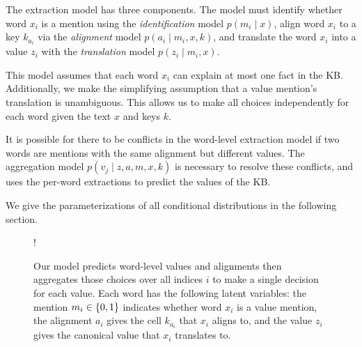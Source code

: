 \documentclass[12pt]{article}
\begin{document}
The extraction model has three components.
The model must identify whether word $x_i$
is a mention using the \textit{identification} model $p(m_i \mid x)$,
align word $x_i$ to a key $k_{a_i}$ via the \textit{alignment} model $p(a_i \mid m_i,x, k)$,
and translate the word $x_i$ into a value $z_i$ with the
\textit{translation} model $p(z_i \mid m_i,x)$.

This model assumes that each word $x_i$ can explain at most one fact in the KB.
Additionally, we make the simplifying assumption
that a value mention's translation is unambiguous.
This allows us to make all choices independently
for each word given the text $x$ and keys $k$.

It is possible for there to be conflicts in the word-level extraction model if 
two words are mentions with the same alignment but different values.
The aggregation model $p(v_j \mid z,a,m,x,k)$ is necessary to resolve these conflicts,
and uses the per-word extractions to predict the values of the KB.

We give the parameterizations of all conditional distributions in the following section.

\begin{figure}[h]
\begin{center}
\resizebox {.35\columnwidth} {!} {
} %
\end{center}
\caption{Our model predicts word-level values and alignments
then aggregates those choices over all indices $i$ to
make a single decision for each value.
Each word has the following latent variables:
the mention $m_i \in \left\{0,1\right\}$ indicates whether word $x_i$ is a value mention,
the alignment $a_i$ gives the cell $k_{a_i}$ that $x_i$ aligns to,
and the value $z_i$ gives the canonical value that $x_i$ translates to.
}
\label{fig:infmodel}
\end{figure}
\end{document}
